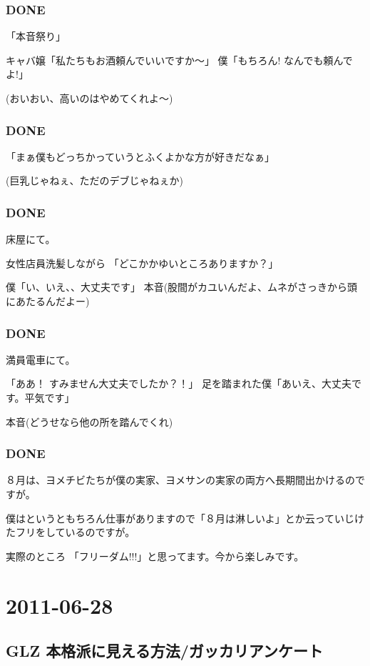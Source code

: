 \documentclass[11pt]{article}
\begin{document}
\subsubsection{\textbf{DONE}}
\label{sec-101_1_1}

「本音祭り」

キャバ嬢「私たちもお酒頼んでいいですか〜」
僕「もちろん! なんでも頼んでよ!」

(おいおい、高いのはやめてくれよ〜)
\subsubsection{\textbf{DONE}}
\label{sec-101_1_2}

「まぁ僕もどっちかっていうとふくよかな方が好きだなぁ」

(巨乳じゃねぇ、ただのデブじゃねぇか)
\subsubsection{\textbf{DONE}}
\label{sec-101_1_3}

床屋にて。

女性店員洗髪しながら
「どこかかゆいところありますか？」

僕「い、いえ、、大丈夫です」
本音(股間がカユいんだよ、ムネがさっきから頭にあたるんだよー)
\subsubsection{\textbf{DONE}}
\label{sec-101_1_4}

満員電車にて。

「ああ！ すみません大丈夫でしたか？！」
足を踏まれた僕「あいえ、大丈夫です。平気です」

本音(どうせなら他の所を踏んでくれ)
\subsubsection{\textbf{DONE}}
\label{sec-101_1_5}

８月は、ヨメチビたちが僕の実家、ヨメサンの実家の両方へ長期間出かけるのですが。

僕はというともちろん仕事がありますので「８月は淋しいよ」とか云っていじけたフリをしているのですが。

実際のところ
「フリーダム!!!」と思ってます。今から楽しみです。
\section{2011-06-28}
\label{sec-102}
\subsection{GLZ 本格派に見える方法/ガッカリアンケート}
\label{sec-102_1}
\end{document}
